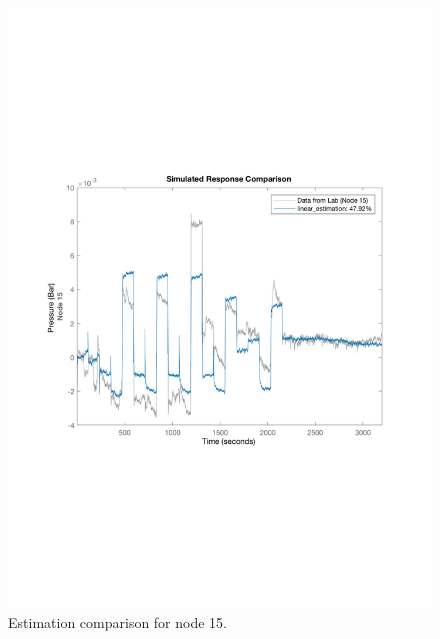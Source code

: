 \begin{figure}[H]
  \centering
  \begin{minipage}[b]{0.45\textwidth}
    \includegraphics[width=\textwidth]{report/pictures/Node15_estimation_1.pdf}
    \caption{Estimation comparison for node 15.}
  \end{minipage}
  \hfill
  \begin{minipage}[b]{0.45\textwidth}

\end{minipage}
\end{figure}
